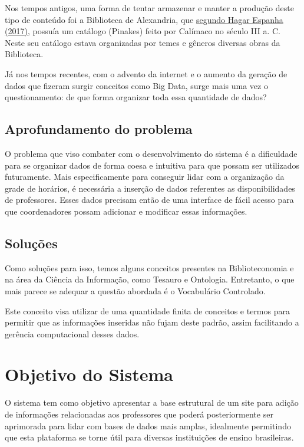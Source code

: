     Nos tempos antigos, uma forma de tentar armazenar e manter a produção deste tipo de conteúdo foi a Biblioteca de Alexandria, que \href{https://brapci.inf.br/index.php/res/v/33713}{segundo Hagar Espanha (2017)}, possuía um catálogo (Pinakes) feito por Calímaco no século III a. C. Neste seu catálogo estava organizadas por temes e gêneros diversas obras da Biblioteca. 

    Já nos tempos recentes, com o advento da internet e o aumento da geração de dados que fizeram surgir conceitos como Big Data, surge mais uma vez o questionamento: de que forma organizar toda essa quantidade de dados?

    \subsection{Aprofundamento do problema}

        O problema que viso combater com o desenvolvimento do sistema é a dificuldade para se organizar dados de forma coesa e intuitiva para que possam ser utilizados futuramente. Mais especificamente para conseguir lidar com a organização da grade de horários, é necessária a inserção de dados referentes as disponibilidades de professores. Esses dados precisam então de uma interface de fácil acesso para que coordenadores possam adicionar e modificar essas informações. %

    \subsection{Soluções}

        Como soluções para isso, temos alguns conceitos presentes na Biblioteconomia e na área da Ciência da Informação, como Tesauro e Ontologia. Entretanto, o que mais parece se adequar a questão abordada é o Vocabulário Controlado.

        Este conceito visa utilizar de uma quantidade finita de conceitos e termos para permitir que as informações inseridas não fujam deste padrão, assim facilitando a gerência computacional desses dados.

\section{Objetivo do Sistema} %

    O sistema tem como objetivo apresentar a base estrutural de um site para adição de informações relacionadas aos professores que poderá posteriormente ser aprimorada para lidar com bases de dados mais amplas, idealmente permitindo que esta plataforma se torne útil para diversas instituições de ensino brasileiras.


